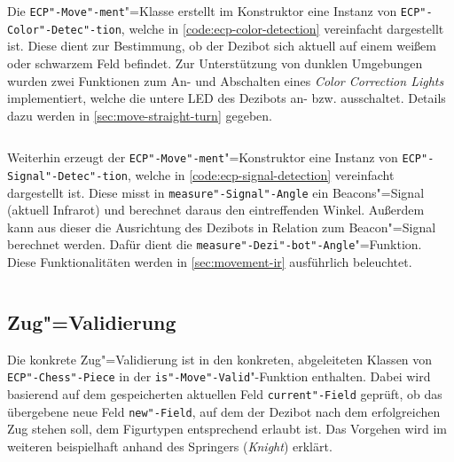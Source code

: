 
Die \texttt{ECP"-Move"-ment}"=Klasse erstellt im Konstruktor eine Instanz von \texttt{ECP"-Color"-Detec"-tion}, welche in \autoref{code:ecp-color-detection} vereinfacht dargestellt ist. Diese dient zur Bestimmung, ob der Dezibot sich aktuell auf einem weißem oder schwarzem Feld befindet. Zur Unterstützung von dunklen Umgebungen wurden zwei Funktionen zum An- und Abschalten eines \emph{Color Correction Lights} implementiert, welche die untere LED des Dezibots an- bzw. ausschaltet. Details dazu werden in \autoref{sec:move-straight-turn} gegeben.

\begin{listing}[h]
    \inputminted{cpp}{../assets/code/ECPColorDetection.cpp}
    \caption{Vereinfachter Code"=Ausschnitt zur \texttt{ECP"-Color"-Detec"-tion}"=Klasse}
    \label{code:ecp-color-detection}
\end{listing}


Weiterhin erzeugt der \texttt{ECP"-Move"-ment}"=Konstruktor eine Instanz von \texttt{ECP"-Signal"-Detec"-tion}, welche in \autoref{code:ecp-signal-detection} vereinfacht dargestellt ist. Diese misst in \texttt{measure"-Signal"-Angle} ein Beacons"=Signal (aktuell Infrarot) und berechnet daraus den eintreffenden Winkel. Außerdem kann aus dieser die Ausrichtung des Dezibots in Relation zum Beacon"=Signal berechnet werden. Dafür dient die \texttt{measure"-Dezi"-bot"-Angle}"=Funktion. Diese Funktionalitäten werden in \autoref{sec:movement-ir} ausführlich beleuchtet.

\begin{listing}[h]
    \inputminted{cpp}{../assets/code/ECPSignalDetection.cpp}
    \caption{Vereinfachter Code"=Ausschnitt zur \texttt{ECP"-Signal"-Detec"-tion}"=Klasse}
    \label{code:ecp-signal-detection}
\end{listing}


\subsection{Zug"=Validierung}
\label{sec:move-validation}

Die konkrete Zug"=Validierung ist in den konkreten, abgeleiteten Klassen von \texttt{ECP"-Chess"-Piece} in der \texttt{is"-Move"-Valid}"-Funktion enthalten. Dabei wird basierend auf dem gespeicherten aktuellen Feld \texttt{current"-Field} geprüft, ob das übergebene neue Feld \texttt{new"-Field}, auf dem der Dezibot nach dem erfolgreichen Zug stehen soll, dem Figurtypen entsprechend erlaubt ist. Das Vorgehen wird im weiteren beispielhaft anhand des Springers (\emph{Knight}) erklärt.

